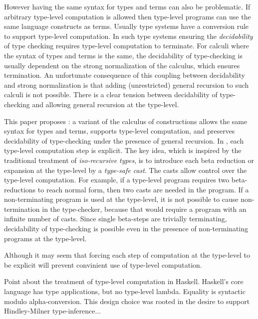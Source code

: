 However having the same syntax for types and terms can also 
be problematic. If arbitrary type-level computation is allowed 
then type-level programs can use the same language constructs 
as terms. Usually type systems have a conversion rule to support type-level
computation. In such type systems ensuring the \emph{decidability} of
type checking requires type-level computation to terminate.  For
calculi where the syntax of types and terms is the same, the
decidability of type-checking is usually dependent on the strong
normalization of the calculus, which ensures termination. An
unfortunate consequence of this coupling between decidability and
strong normalization is that adding (unrestricted) general recursion
to such calculi is not possible. There is a clear tension 
between decidability of type-checking and allowing general recursion 
at the type-level.


This paper proposes \name: a variant of the calculus of constructions
allows the same syntax for types and terms, supports type-level
computation, and preserves decidability of type-checking under the
presence of general recursion. In \name, each type-level computation
step is explicit.    The key idea, which is inspired by the traditional
treatment of \emph{iso-recursive types}, is to introduce each beta
reduction or expansion at the type-level by a \emph{type-safe
  cast}. The
casts allow control over the type-level computation. For example, if
a type-level program requires two beta-reductions to reach normal
form, then two casts are needed in the program. If a non-terminating
program is used at the type-level, it is not possible to cause
non-termination in the type-checker, because that would require a
program with an infinite number of casts. Since single beta-steps are
trivially terminating, decidability of type-checking is possible even
in the presence of non-terminating programs at the type-level. 

Although it may seem that forcing each step of computation 
at the type-level to be explicit will prevent convinient use of 
type-level computation.

Point about the treatment of type-level computation in Haskell. Haskell's
core language has type applications, but no type-level lambda. Equality 
is syntactic modulo alpha-conversion. This design choice was rooted in the 
desire to support Hindley-Milner type-inference... 

